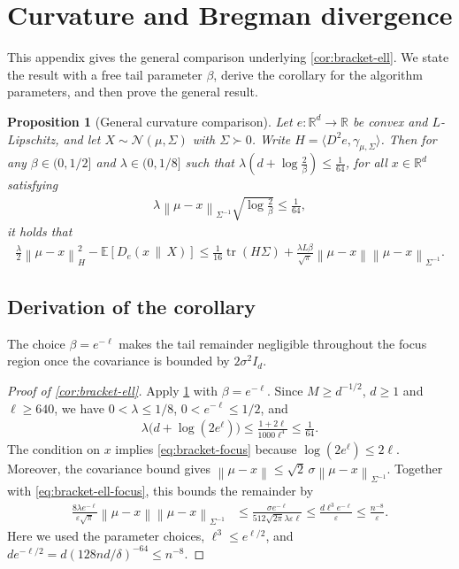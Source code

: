 \documentclass[11pt]{article}
\newtheorem{proposition}[proposition]{Proposition}
\newcommand{\R}{\mathbb R}
\newcommand{\E}{\mathbb E}
\newcommand{\N}{\mathcal N}
\newcommand{\tr}{\operatorname{tr}}
\newcommand{\1}{\mathbf 1}
\newcommand{\eps}{\varepsilon}
\newcommand{\norm}[1]{\left\lVert #1\right\rVert}
\newcommand{\normm}[2]{\left\lVert #1\right\rVert_{#2}}
\begin{document}
\section{Curvature and Bregman divergence}
\label{app:bracket}
This appendix gives the general comparison underlying \cref{cor:bracket-ell}.
We state the result with a free tail parameter $\beta$, derive the corollary
for the algorithm parameters, and then prove the general result.

\begin{proposition}[General curvature comparison]
    \label{prop:bracket}
    Let $e:\R^d\to\R$ be convex and $L$-Lipschitz, and let
    $X\sim\N(\mu,\Sigma)$ with $\Sigma\succ0$.
    Write $H=\langle D^2e,\gamma_{\mu,\Sigma}\rangle$.
    Then for any $\beta\in(0,1/2]$ and $\lambda\in(0, 1/8]$
    such that $\lambda\left(d+\log\frac2\beta\right) \leq \frac{1}{64}$,
    for all $x\in\R^d$ satisfying
    \begin{align}
        \lambda\normm{\mu-x}{\Sigma^{-1}}
        \sqrt{\log\frac2\beta}                \leq \frac{1}{64},
        \label{eq:bracket-focus}
    \end{align}
    it holds that
    \begin{align}
        \frac\lambda2\normm{\mu-x}{H}^2
        -\E[D_e(x\,\|\,X)]
        \leq
        \frac1{16}\tr(H\Sigma)
        +\frac{\lambda L\beta}{\sqrt{\pi}}
        \norm{\mu-x}\normm{\mu-x}{\Sigma^{-1}}.
        \label{eq:bracket}
    \end{align}
\end{proposition}

\subsection{Derivation of the corollary}
The choice $\beta=e^{-\ell}$ makes the tail remainder negligible throughout
the focus region once the covariance is bounded by $2\sigma^2I_d$.

\begin{proof}[Proof of \cref{cor:bracket-ell}]
    Apply \cref{prop:bracket} with $\beta=e^{-\ell}$.
    Since $M\geq d^{-1/2}$, $d\geq1$ and $\ell\geq640$, we have
    $0<\lambda\leq1/8$, $0<e^{-\ell}\leq1/2$, and
    \begin{align}
        \lambda\bigl(d+\log(2e^\ell)\bigr)
        \leq\frac{1+2\ell}{1000\ell^4}
        \leq\frac1{64}.
    \end{align}
    The condition on $x$ implies \eqref{eq:bracket-focus} because
    $\log(2e^\ell)\leq2\ell$.
    Moreover, the covariance bound gives
    $\norm{\mu-x}\leq\sqrt2\,\sigma\normm{\mu-x}{\Sigma^{-1}}$.
    Together with \eqref{eq:bracket-ell-focus}, this bounds the remainder by
    \begin{align}
        \frac{8\lambda e^{-\ell}}{\eps\sqrt\pi}
        \norm{\mu-x}\normm{\mu-x}{\Sigma^{-1}}
         & \leq\frac{\sigma e^{-\ell}}{512\sqrt{2\pi}\lambda\eps\ell}
        \leq\frac{d\ell^3e^{-\ell}}{\eps}
        \leq\frac{n^{-8}}{\eps}.
    \end{align}
    Here we used the parameter choices, $\ell^3\leq e^{\ell/2}$, and
    $de^{-\ell/2}=d(128nd/\delta)^{-64}\leq n^{-8}$.
\end{proof}
\end{document}
